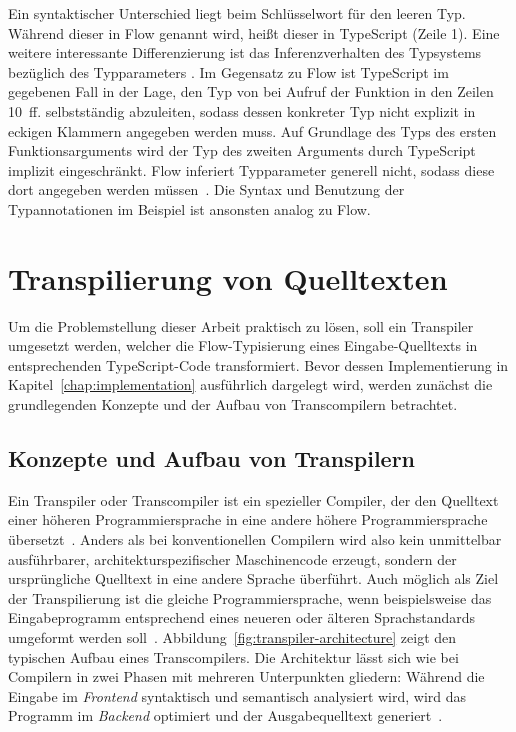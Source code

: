 Ein syntaktischer Unterschied liegt beim Schlüsselwort für den leeren Typ. Während dieser in Flow  genannt wird, heißt dieser in TypeScript  (Zeile 1).
Eine weitere interessante Differenzierung ist das Inferenzverhalten des Typsystems bezüglich des Typparameters . Im Gegensatz zu Flow ist TypeScript im gegebenen Fall in der Lage, den Typ von  bei Aufruf der Funktion  in den Zeilen 10~ff. selbstständig abzuleiten, sodass dessen konkreter Typ nicht explizit in eckigen Klammern angegeben werden muss.  Auf Grundlage des Typs des ersten Funktionsarguments wird der Typ des zweiten Arguments durch TypeScript implizit eingeschränkt. Flow inferiert Typparameter generell nicht, sodass diese dort angegeben werden müssen~\autocite{FLOW:GENERICS}. Die Syntax und Benutzung der Typannotationen im Beispiel ist ansonsten analog zu Flow.

\section{Transpilierung von Quelltexten}
\label{sec:transpilers}

Um die Problemstellung dieser Arbeit praktisch zu lösen, soll ein Transpiler umgesetzt werden, welcher die Flow-Typisierung eines Eingabe-Quelltexts in entsprechenden TypeScript-Code transformiert. Bevor dessen Implementierung in Kapitel~\ref{chap:implementation} ausführlich dargelegt wird, werden zunächst die grundlegenden Konzepte und der Aufbau von Transcompilern betrachtet.

\subsection{Konzepte und Aufbau von Transpilern}
\label{sec:transpiler-concepts}

Ein Transpiler oder Transcompiler ist ein spezieller Compiler, der den Quelltext einer höheren Programmiersprache in eine andere höhere Programmiersprache übersetzt~\autocite[3]{AHO:COMPILERS}. Anders als bei konventionellen Compilern wird also kein unmittelbar ausführbarer, architekturspezifischer Maschinencode erzeugt, sondern der ursprüngliche Quelltext in eine andere Sprache überführt. Auch möglich als Ziel der Transpilierung ist die gleiche Programmiersprache, wenn beispielsweise das Eingabeprogramm entsprechend eines neueren oder älteren Sprachstandards umgeformt werden soll~\autocite{EVGENIY:2016}.
Abbildung~\ref{fig:transpiler-architecture} zeigt den typischen Aufbau eines Transcompilers. Die Architektur lässt sich wie bei Compilern in zwei Phasen mit mehreren Unterpunkten gliedern: Während die Eingabe im \emph{Frontend} syntaktisch und semantisch analysiert wird, wird das Programm im \emph{Backend} optimiert und der Ausgabequelltext generiert~\autocite[136]{APPEL:2003}.


